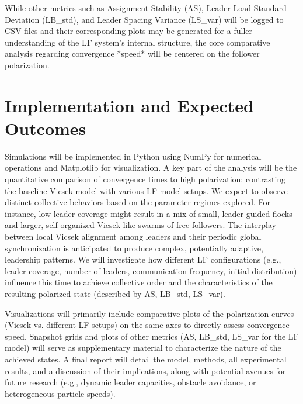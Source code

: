 \documentclass[11pt]{article}
\begin{document}
While other metrics such as Assignment Stability (AS), Leader Load Standard Deviation (LB\_std), and Leader Spacing Variance (LS\_var) will be logged to CSV files and their corresponding plots may be generated for a fuller understanding of the LF system's internal structure, the core comparative analysis regarding convergence *speed* will be centered on the follower polarization.

\section{Implementation and Expected Outcomes}
Simulations will be implemented in Python using NumPy for numerical operations and Matplotlib for visualization. 
A key part of the analysis will be the quantitative comparison of convergence times to high polarization: contrasting the baseline Vicsek model with various LF model setups. We expect to observe distinct collective behaviors based on the parameter regimes explored. For instance, low leader coverage might result in a mix of small, leader-guided flocks and larger, self-organized Vicsek-like swarms of free followers. The interplay between local Vicsek alignment among leaders and their periodic global synchronization is anticipated to produce complex, potentially adaptive, leadership patterns. We will investigate how different LF configurations (e.g., leader coverage, number of leaders, communication frequency, initial distribution) influence this time to achieve collective order and the characteristics of the resulting polarized state (described by AS, LB\_std, LS\_var).

Visualizations will primarily include comparative plots of the polarization curves (Vicsek vs. different LF setups) on the same axes to directly assess convergence speed. Snapshot grids and plots of other metrics (AS, LB\_std, LS\_var for the LF model) will serve as supplementary material to characterize the nature of the achieved states. A final report will detail the model, methods, all experimental results, and a discussion of their implications, along with potential avenues for future research (e.g., dynamic leader capacities, obstacle avoidance, or heterogeneous particle speeds).
\end{document}
